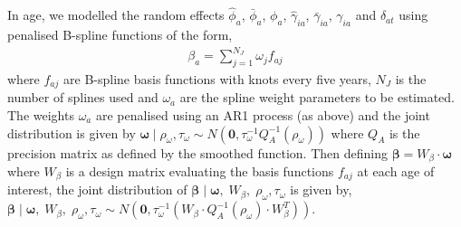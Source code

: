 \documentclass{article}
\begin{document}
\begin{appendix}
\noindent In age, we modelled the random effects $\hat{\phi}_a$, $\bar{\phi}_a$, $\phi_a$, $\hat{\gamma}_{ia}$, $\bar{\gamma}_{ia}$, $\gamma_{ia}$ and $\delta_{at}$ using penalised B-spline functions of the form,
\begin{align*} 
	\beta_a = \sum_{j = 1}^{N_J} \omega_{j}f_{aj}
\end{align*} 
where $f_{aj}$ are B-spline basis functions with knots every five years, $N_J$ is the number of splines used and $\omega_{a}$ are the spline weight parameters to be estimated. The weights $\omega_{a}$ are penalised using an AR1 process (as above) and the joint distribution is given by $\boldsymbol{\omega}\; | \; \rho_{\omega}, \tau_{\omega} \sim N(\boldsymbol{0}, \tau_{\omega}^{-1}Q^{-1}_{A}(\rho_{\omega}))$ where $Q_{A}$ is the precision matrix as defined by the smoothed function. Then defining $\boldsymbol{\beta} = W_{\beta}\cdot \boldsymbol{\omega}$ where $W_{\beta}$ is a design matrix evaluating the basis functions $f_{aj}$ at each age of interest, the joint distribution of $\boldsymbol{\beta}\; | \;\boldsymbol{\omega}, \; W_{\beta}, \; \rho_{\omega}, \tau_{\omega}$ is given by, $\boldsymbol{\beta}\; | \;\boldsymbol{\omega}, \; W_{\beta}, \; \rho_{\omega}, \tau_{\omega} \sim N(\boldsymbol{0}, \tau_{\omega}^{-1}(W_{\beta}\cdot Q^{-1}_{A}(\rho_{\omega})\cdot W_{\beta}^T))$.\\


\end{appendix}
\end{document}
